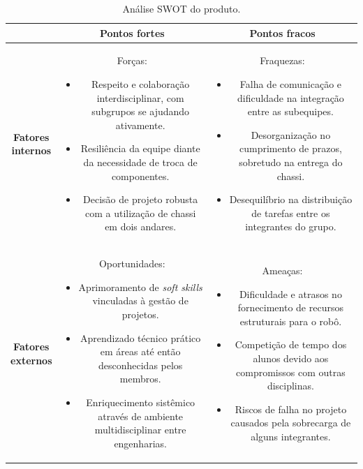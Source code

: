 \begin{table}[ht]
\centering
\caption{Análise SWOT do produto.}
\begin{tabular}{|c|c|c|} \hline
 & \textbf{Pontos fortes} & \textbf{Pontos fracos}  \\ \hline 
    {\parbox{0.1\textwidth}{ \textbf{Fatores \\ internos}}}  &
    {\parbox{0.4\textwidth}{ Forças: 
        \begin{itemize}
            \item Respeito e colaboração interdisciplinar, com subgrupos se ajudando ativamente.
            \item Resiliência da equipe diante da necessidade de troca de componentes.
            \item Decisão de projeto robusta com a utilização de chassi em dois andares.
        \end{itemize} }} & 
    {\parbox{0.4\textwidth}{ Fraquezas:
        \begin{itemize}
            \item Falha de comunicação e dificuldade na integração entre as subequipes.
            \item Desorganização no cumprimento de prazos, sobretudo na entrega do chassi.
            \item Desequilíbrio na distribuição de tarefas entre os integrantes do grupo.
        \end{itemize} }}\\ \hline
    {\parbox{0.1\textwidth}{ \textbf{Fatores \\ externos}}}  &
    {\parbox{0.4\textwidth}{ Oportunidades:
        \begin{itemize}
            \item Aprimoramento de \textit{soft skills} vinculadas à gestão de projetos.
            \item Aprendizado técnico prático em áreas até então desconhecidas pelos membros.
            \item Enriquecimento sistêmico através de ambiente multidisciplinar entre engenharias.
        \end{itemize} }} & 
    {\parbox{0.4\textwidth}{ Ameaças:
        \begin{itemize}
            \item Dificuldade e atrasos no fornecimento de recursos estruturais para o robô.
            \item Competição de tempo dos alunos devido aos compromissos com outras disciplinas.
            \item Riscos de falha no projeto causados pela sobrecarga de alguns integrantes.
        \end{itemize} }}\\ \hline
\end{tabular}
\label{tab:swot}
\end{table}


